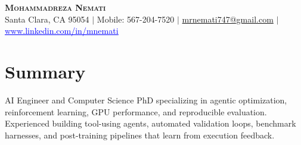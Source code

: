 \documentclass[letterpaper,13pt]{article}
\begin{document}
\begin{center}
    \textbf{\LARGE \scshape Mohammadreza Nemati} \\ \vspace{1pt}
    \small Santa Clara, CA 95054 $|$ Mobile: 567-204-7520 $|$
    \href{mailto:mrnemati747@gmail.com}{mrnemati747@gmail.com} $|$
    \href{https://www.linkedin.com/in/mnemati/}{\textcolor{blue}{\underline{www.linkedin.com/in/mnemati}}}
\end{center}

\section{Summary}
\small{AI Engineer and Computer Science PhD specializing in agentic optimization, reinforcement learning, GPU performance, and reproducible evaluation. Experienced building tool-using agents, automated validation loops, benchmark harnesses, and post-training pipelines that learn from execution feedback.}
\vspace{0.05cm}
\end{document}
